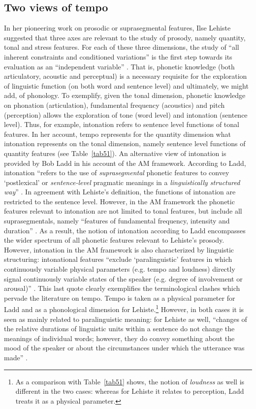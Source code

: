 \subsection{Two views of tempo}\label{sec511}
In her pioneering work on prosodic or suprasegmental features, Ilse Lehiste suggested that three axes are relevant to the study of prosody, namely quantity, tonal and stress features. For each of these three dimensions, the study of ``all inherent constraints and conditioned variations'' is the first step towards its evaluation as an ``independent variable'' \cite[3]{lehiste1970suprasegmentals}. That is, phonetic knowledge (both articulatory, acoustic and perceptual) is a necessary requisite for the exploration of linguistic function (on both word and sentence level) and ultimately, we might add, of phonology. To exemplify, given the tonal dimension, phonetic knowledge on phonation (articulation), fundamental frequency (acoustics) and pitch (perception) allows the exploration of tone (word level) and intonation (sentence level). Thus, for example, intonation refers to sentence level functions of tonal features. In her account, tempo represents for the quantity dimension what intonation represents on the tonal dimension, namely sentence level functions of quantity features (see Table~\ref{tab51}).
An alternative view of intonation is provided by Bob Ladd in his account of the AM framework. According to Ladd, intonation ``refers to the use of \textit{suprasegmental} phonetic features to convey `postlexical' or \textit{sentence-level} pragmatic meanings in a \textit{linguistically structured way}'' \cite[4; original emphasis]{ladd2008intonational}. In agreement with Lehiste's definition, the functions of intonation are restricted to the sentence level. However, in the AM framework the phonetic features relevant to intonation are not limited to tonal features, but include all suprasegmentals, namely ``features of fundamental frequency, intensity and duration'' \cite[ibid.]{ladd2008intonational}. As a result, the notion of intonation according to Ladd encompasses the wider spectrum of all phonetic features relevant to Lehiste's prosody. However, intonation in the AM framework is also characterized by linguistic structuring: intonational features ``exclude `paralinguistic' features in which continuously variable physical parameters (e.g. tempo and loudness) directly signal continuously variable states of the speaker (e.g. degree of involvement or arousal)'' \cite[6]{ladd2008intonational}.
This last quote clearly exemplifies the terminological clashes which pervade the literature on tempo. Tempo is taken as a physical parameter for Ladd and as a phonological dimension for Lehiste.\footnote{As a comparison with Table~\ref{tab51} shows, the notion of \textit{loudness} as well is different in the two cases: whereas for Lehiste it relates to perception, Ladd treats it as a physical parameter.} However, in both cases it is seen as mainly related to paralinguistic meaning: for Lehiste as well, ``changes of the relative durations of linguistic units within a sentence do not change the meanings of individual words; however, they do convey something about the mood of the speaker or about the circumstances under which the utterance was made'' \cite[§2.5.3]{lehiste1970suprasegmentals}.
